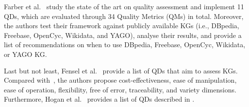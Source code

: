 \documentclass[runningheads]{llncs}
\begin{document}
Farber et al.~\cite{FarberBMR18} study the state of the art on quality assessment and implement 11 QDs, which are evaluated through 34 Quality Metrics (QMs) in total. Moreover, the authors test their framework against publicly available KGs (i.e., DBpedia, Freebase, OpenCyc, Wikidata, and YAGO), analyse their results, and provide a list of recommendations on when to use DBpedia, Freebase, OpenCyc, Wikidata, or YAGO KG.

Last but not least, Fensel et al.~\cite{FenselSAHKPTUW20} provide a list of QDs that aim to assess KGs. Compared with~\cite{bizer2007,FarberBMR18,NaumannR00,WangS96,ZaveriRMPLA16}, the authors propose cost-effectiveness, ease of manipulation, ease of operation, flexibility, free of error, traceability, and variety dimensions. Furthermore, Hogan et al.~\cite{Hogan21} provides a list of QDs described in \cite{ZaveriRMPLA16}.
\end{document}
